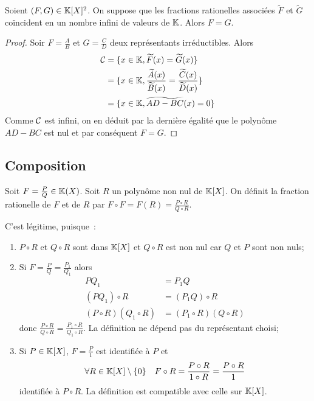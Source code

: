 \begin{prop}
  Soient $(F,G) \in \mathbb{K}[X]^2$. On suppose que les fractions rationelles associées $\widetilde{F}$ et $\widetilde{G}$ coïncident en un nombre infini de valeurs de $\mathbb{K}$. Alors $F=G$.
\end{prop}
\begin{proof}
  Soir $F=\frac{A}{B}$ et $G=\frac{C}{D}$ deux représentants irréductibles. Alors
  \begin{align}
    \mathcal{C} &=\{x \in \mathbb{K}, \widetilde{F}(x)=\widetilde{G}(x)\} \\
    &=\{x \in \mathbb{K}, \frac{\widetilde{A}(x)}{\widetilde{B}(x)}=\frac{\widetilde{C}(x)}{\widetilde{D}(x)}\} \\
    &=\{x \in \mathbb{K}, \widetilde{AD-BC}(x)=0 \}\\
  \end{align}
  Comme $\mathcal{C}$ est infini, on en déduit par la dernière égalité que le polynôme $AD-BC$ est nul et par conséquent $F=G$.
\end{proof}

\subsection{Composition}

\begin{defdef}
  Soit $F=\frac{P}{Q} \in \mathbb{K}(X)$. Soit $R$ un polynôme non nul de $\mathbb{K}[X]$. On définit la fraction rationelle de $F$ et de $R$ par $F \circ F = F(R) = \frac{P \circ R}{Q \circ R}$.
\end{defdef}

C'est légitime, puisque~:
\begin{enumerate}
\item $P \circ R$ et $Q \circ R$ sont dans $\mathbb{K}[X]$ et $Q \circ R$ est non nul car $Q$ et $P$ sont non nuls;
\item Si $F=\frac{P}{Q}=\frac{P_1}{Q_1}$ alors
  \begin{align}
    PQ_1&=P_1Q \\
    (PQ_1) \circ R &= (P_1Q) \circ R\\
    (P\circ R)(Q_1\circ R) &= (P_1\circ R)(Q\circ R)
  \end{align}
  donc $\frac{P \circ R}{Q \circ R}=\frac{P_1 \circ R}{Q_1 \circ R}$. La définition ne dépend pas du représentant choisi;
\item Si $P \in \mathbb{K}[X]$, $F=\frac{P}{1}$ est identifiée à $P$ et
  \begin{equation}
    \forall R \in \mathbb{K}[X]\setminus\{0\} \quad F \circ R = \frac{P \circ R}{1 \circ R}=\frac{P \circ R}{1}  
  \end{equation}
  identifiée à $P\circ R$. La définition est compatible avec celle sur $\mathbb{K}[X]$.
\end{enumerate}

